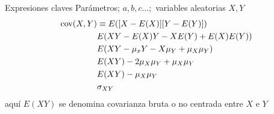 \begin{frame}{Expresiones claves}
	Parámetros; $a, b, c \ldots;$ variables aleatorias $X, Y$
		\begin{align*}
			\textup{cov}(X,Y) & \equiv E([X-E(X)][Y-E(Y)])\\
			& E(XY - E(X)Y-XE(Y)+E(X)E(Y))\\
			& E(XY-\mu_{x}Y-X\mu_{Y}+\mu_{X}\mu_{Y})\\
			& E(XY)-2\mu_{X}\mu_{Y}+\mu_{X}\mu_{Y}\\
			& E(XY)-\mu_{X}\mu_{Y}\\
			& \sigma_{XY}
		\end{align*}
	aquí $E(XY)$ se denomina covarianza bruta o no centrada entre $X$ e $Y$
\end{frame}

